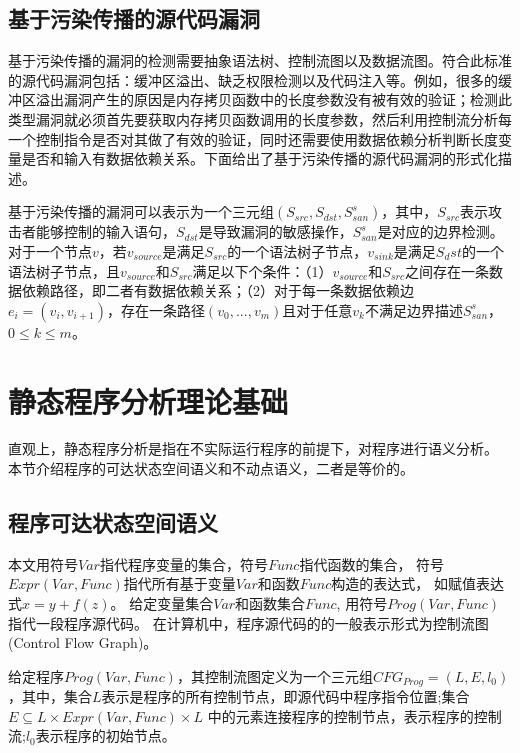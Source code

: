 \subsection{基于污染传播的源代码漏洞}

基于污染传播的漏洞的检测需要抽象语法树、控制流图以及数据流图。符合此标准的源代码漏洞包括：缓冲区溢出、缺乏权限检测以及代码注入等。例如，很多的缓冲区溢出漏洞产生的原因是内存拷贝函数中的长度参数没有被有效的验证；检测此类型漏洞就必须首先要获取内存拷贝函数调用的长度参数，然后利用控制流分析每一个控制指令是否对其做了有效的验证，同时还需要使用数据依赖分析判断长度变量是否和输入有数据依赖关系。下面给出了基于污染传播的源代码漏洞的形式化描述。

\begin{definition}
\label{基于污染传播的源代码漏洞描述}
基于污染传播的漏洞可以表示为一个三元组$(S_{src},S_{dst},S^{s}_{san})$，其中，$S_{src}$表示攻击者能够控制的输入语句，$S_{dst}$是导致漏洞的敏感操作，$S^{s}_{san}$是对应的边界检测。对于一个节点$v$，若$v_{source}$是满足$S_{src}$的一个语法树子节点，$v_{sink}$是满足$S_dst$的一个语法树子节点，且$v_{source}$和$S_{src}$满足以下个条件：（1）$v_{source}$和$S_{src}$之间存在一条数据依赖路径，即二者有数据依赖关系；（2）对于每一条数据依赖边$e_i = (v_i, v_{i+1})$，存在一条路径$(v_0,...,v_m)$且对于任意$v_k$不满足边界描述$S^{s}_{san}$，$0 \leq k \leq m$。
\end{definition}

\section{静态程序分析理论基础}

直观上，静态程序分析是指在不实际运行程序的前提下，对程序进行语义分析。
本节介绍程序的可达状态空间语义和不动点语义，二者是等价的。

\subsection{程序可达状态空间语义}

本文用符号$Var$指代程序变量的集合，符号$Func$指代函数的集合，
符号$Expr(Var, Func)$指代所有基于变量$Var$和函数$Func$构造的表达式，
如赋值表达式$x = y + f(z)$。
给定变量集合$Var$和函数集合$Func$, 用符号$Prog(Var, Func)$指代一段程序源代码。
在计算机中，程序源代码的的一般表示形式为控制流图(Control Flow Graph)。

\begin{definition}
给定程序$Prog(Var, Func)$，其控制流图定义为一个三元组$CFG_{Prog} = (L, E, l_0)$，其中，集合$L$表示是程序的所有控制节点，即源代码中程序指令位置;集合$E\subseteq L\times Expr(Var, Func) \times L$
	中的元素连接程序的控制节点，表示程序的控制流;$l_0$表示程序的初始节点。
\end{definition}


